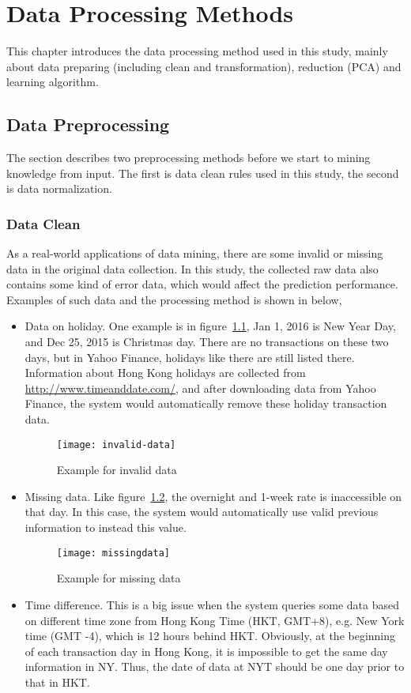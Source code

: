 \chapter{Data Processing Methods}
\label{ch:mining}

This chapter introduces the data processing method used in this study, mainly about data preparing (including clean and transformation), reduction (PCA) and learning algorithm.

\section{Data Preprocessing}
The section describes two preprocessing methods before we start to mining knowledge from input. The first is data clean rules used in this study, the second is data normalization.

\subsection{Data Clean}
\label{sec:dataClean}
As a real-world applications of data mining, there are some invalid or missing data in the original data collection. In this study, the collected raw data also contains some kind of error data, which would affect the prediction performance. Examples of such data and the processing method is shown in below,

\begin{itemize}
	\item Data on holiday. One example is in figure~\ref{fg:invalid_data}, Jan 1, 2016 is New Year Day, and Dec 25, 2015 is Christmas day. There are no transactions on these two days, but in Yahoo Finance, holidays like there are still listed there. Information about Hong Kong holidays are collected from \url{http://www.timeanddate.com/}, and after downloading data from Yahoo Finance, the system would automatically remove these holiday transaction data.
	\begin{figure}[h]
		\centering
		\texttt{[image: invalid-data]}
		\caption{Example for invalid data}
		\label{fg:invalid_data}
	\end{figure}
	\item Missing data. Like figure~\ref{fg:missing_data}, the overnight and 1-week rate is inaccessible on that day. In this case, the system would automatically use valid previous information to instead this value.
	\begin{figure}[h]
		\centering
		\texttt{[image: missingdata]}
		\caption{Example for missing data}
		\label{fg:missing_data}
	\end{figure}
	\item Time difference. This is a big issue when the system queries some data based on different time zone from Hong Kong Time (HKT, GMT+8), e.g. New York time (GMT -4), which is 12 hours behind HKT. Obviously, at the beginning of each transaction day in Hong Kong, it is impossible to get the same day information in NY. Thus, the date of data at NYT should be one day prior to that in HKT.
\end{itemize}


